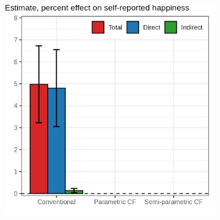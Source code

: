 \documentclass[dvipsnames]{beamer} %
\begin{document}
\begin{frame}
{{\begin{figure}
\begin{subfigure}[c]{0.525\textwidth}
                \includegraphics[width=\textwidth]{
                    ../text/sections/figures/mediation-happy-placeholder.png}
            \end{subfigure}
        \end{figure}
    }}
\end{frame}
\end{document}
